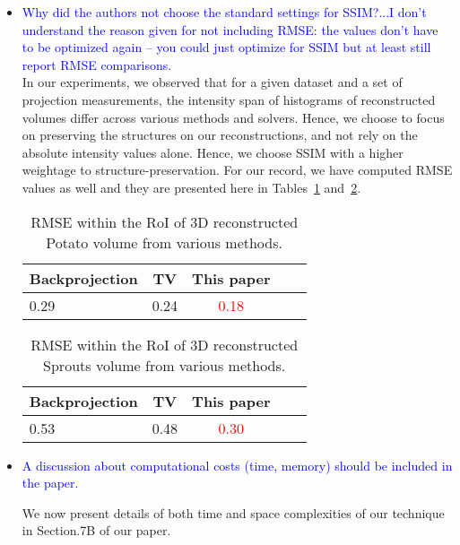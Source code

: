 \documentclass{article}
\begin{document}
\begin{itemize}
\begin{itemize}
\item \textcolor{blue}{Why did the authors not choose the standard
  settings for SSIM?...I don’t understand the reason given for not
  including RMSE: the values don’t have to be optimized again -- you
  could just optimize for SSIM but at least still report RMSE
  comparisons.}\\
  
  In our experiments, we observed that for a given dataset and a set of projection measurements, the intensity span of histograms of reconstructed volumes differ across various methods and solvers. Hence, we choose to focus on preserving the structures on our reconstructions, and not rely on the absolute intensity values alone. Hence, we choose SSIM with a higher weightage to structure-preservation. For our record, we have computed RMSE values as well and they are presented here in Tables~\ref{table:potato_rmse} and~\ref{table:sprouts_rmse}.

\begin{table}[!h]
  \centering
 \caption{RMSE within the RoI of 3D reconstructed Potato volume from various
    methods.}
\begin{tabular}{|l|c|c|c|c|}
\hline 
\textbf{Backprojection} & \textbf{TV} & \textbf{This paper}
\\ \hline  0.29 & 0.24 & \textcolor{red}{0.18}
\\ \hline
\end{tabular}
\label{table:potato_rmse}
\end{table}

\begin{table}[!h]
  \centering
 \caption{RMSE within the RoI of 3D reconstructed Sprouts volume from various
    methods.}
\begin{tabular}{|l|c|c|c|c|}
\hline 
\textbf{Backprojection} & \textbf{TV} & \textbf{This paper}
\\ \hline  0.53 & 0.48 & \textcolor{red}{0.30}
\\ \hline
\end{tabular}
\label{table:sprouts_rmse}
\end{table}


\item  \textcolor{blue}{A discussion about computational costs (time, memory) should be included in the paper.}
  
  We now present details of both time and space complexities of our technique in Section.7B of our paper.


\end{itemize}
\end{itemize}
\end{document}
